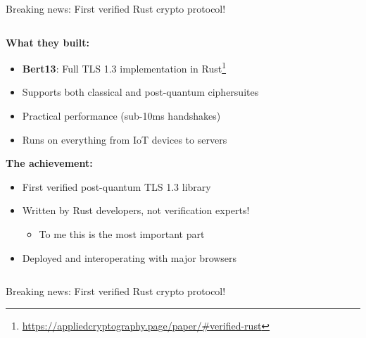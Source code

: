 \documentclass[aspectratio=169, lualatex, handout]{beamer}
\begin{document}
\begin{frame}{Breaking news: First verified Rust crypto protocol!}
	\begin{columns}[c]
		\begin{column}{1\textwidth}
			\textbf{What they built:}
			\begin{itemize}
				\item \textbf{Bert13}: Full TLS 1.3 implementation in Rust\footnote{\url{https://appliedcryptography.page/paper/\#verified-rust}}
				\item Supports both classical and post-quantum ciphersuites
				\item Practical performance (sub-10ms handshakes)
				\item Runs on everything from IoT devices to servers
			\end{itemize}
			\vspace{0.25em}
			\textbf{The achievement:}
			\begin{itemize}
				\item First verified post-quantum TLS 1.3 library
				\item Written by Rust developers, not verification experts!
				      \begin{itemize}
					      \item To me this is the most important part
				      \end{itemize}
				\item Deployed and interoperating with major browsers
			\end{itemize}
		\end{column}
	\end{columns}
\end{frame}

\begin{frame}{Breaking news: First verified Rust crypto protocol!}
\end{frame}
\end{document}
